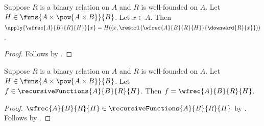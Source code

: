 \begin{theorem}\label{wfrec_equation}
    Suppose $R$ is a binary relation on $A$ and $R$ is well-founded on $A$.
    Let $H\in\funs{A\times\pow{A\times B}}{B}$.
    Let $x\in A$.
    Then
        $\apply{\wfrec{A}{B}{R}{H}}{x}=
            H((x,\restrl{\wfrec{A}{B}{R}{H}}{\downward{R}{x}}))$.
\end{theorem}
\begin{proof}
    Follows by .
\end{proof}

\begin{theorem}\label{wfrec_unique}
    Suppose $R$ is a binary relation on $A$ and $R$ is well-founded on $A$.
    Let $H\in\funs{A\times\pow{A\times B}}{B}$.
    Let $f\in\recursiveFunctions{A}{B}{R}{H}$.
    Then $f=\wfrec{A}{B}{R}{H}$.
\end{theorem}
\begin{proof}
    $\wfrec{A}{B}{R}{H}\in\recursiveFunctions{A}{B}{R}{H}$
        by .
    Follows by .
\end{proof}
